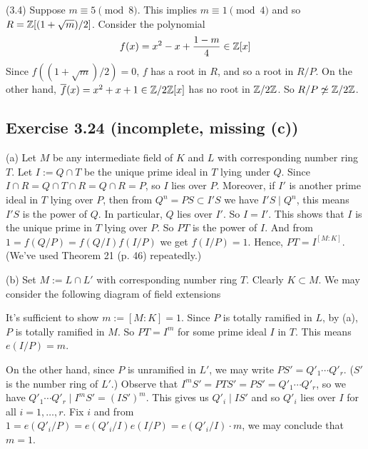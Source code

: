 \documentclass[../Marcus.tex]{subfiles}
\begin{document}
(3.4) Suppose $m\equiv 5\pmod{8}$. This implies $m\equiv 1\pmod{4}$ and so $R=\mathbb{Z}[{(1+\sqrt{m})/2}]$. Consider the polynomial $$f(x)=x^2-x+\frac{1-m}{4}\in\mathbb{Z}[x]$$ Since $f((1+\sqrt{m})/2)=0$, $f$ has a root in $R$, and so a root in $R/P$. On the other hand, $\overline{f}(x)=x^2+x+1\in\mathbb{Z}/2\mathbb{Z}[x]$ has no root in $\mathbb{Z}/2\mathbb{Z}$. So $R/P\not\simeq\mathbb{Z}/2\mathbb{Z}$.

\subsection*{Exercise 3.24 \color{red}(incomplete, missing (c))}

(a) Let $M$ be any intermediate field of $K$ and $L$ with corresponding number ring $T$. Let $I:=Q\cap T$ be the unique prime ideal in $T$ lying under $Q$. Since $I\cap R=Q\cap T\cap R=Q\cap R=P$, so $I$ lies over $P$. Moreover, if $I'$ is another prime ideal in $T$ lying over $P$, then from $Q^n=PS\subset I'S$ we have $I'S\mid Q^n$, this means $I'S$ is the power of $Q$. In particular, $Q$ lies over $I'$. So $I=I'$. This shows that $I$ is the unique prime in $T$ lying over $P$. So $PT$ is the power of $I$. And from $1=f(Q/P)=f(Q/I)f(I/P)$ we get $f(I/P)=1$. Hence, $PT=I^{[M:K]}$. (We've used Theorem 21 (p. 46) repeatedly.)

(b) Set $M:=L\cap L'$ with corresponding number ring $T$. Clearly $K\subset M$. We may consider the following diagram of field extensions
\begin{center}
\end{center}
It's sufficient to show $m:=[M:K]=1$. Since $P$ is totally ramified in $L$, by (a), $P$ is totally ramified in $M$. So $PT=I^m$ for some prime ideal $I$ in $T$. This means $e(I/P)=m$.

On the other hand, since $P$ is unramified in $L'$, we may write $PS'=Q'_1\cdots Q'_r$. ($S'$ is the number ring of $L'$.) Observe that $I^mS'=PTS'=PS'=Q'_1\cdots Q'_r$, so we have $Q'_1\cdots Q'_r\mid I^mS'=(IS')^m$. This gives us $Q'_i\mid IS'$ and so $Q'_i$ lies over $I$ for all $i=1,\ldots,r$. Fix $i$ and from $1=e(Q'_i/P)=e(Q'_i/I)e(I/P)=e(Q'_i/I)\cdot m$, we may conclude that $m=1$.

\end{document}
